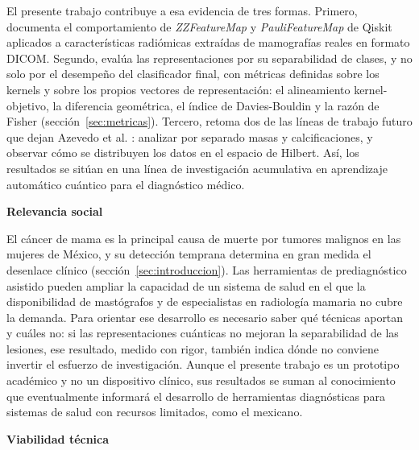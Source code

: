 El presente trabajo contribuye a esa evidencia de tres formas. Primero, documenta el comportamiento
de \textit{ZZFeatureMap} y \textit{PauliFeatureMap} de Qiskit aplicados a características radiómicas
extraídas de mamografías reales en formato DICOM. Segundo, evalúa las representaciones por su
separabilidad de clases, y no solo por el desempeño del clasificador final, con métricas definidas
sobre los kernels y sobre los propios vectores de representación: el alineamiento kernel-objetivo, la
diferencia geométrica, el índice de Davies-Bouldin y la razón de Fisher (sección~\ref{sec:metricas}).
Tercero, retoma dos de las líneas de trabajo futuro que dejan Azevedo et al.
\cite{Azevedo2022QuantumTransfer}: analizar por separado masas y calcificaciones, y observar cómo se
distribuyen los datos en el espacio de Hilbert. Así, los resultados se sitúan en una línea de
investigación acumulativa en aprendizaje automático cuántico para el diagnóstico médico.

\textbf{Relevancia social}

El cáncer de mama es la principal causa de muerte por tumores malignos en las mujeres de México, y su
detección temprana determina en gran medida el desenlace clínico (sección~\ref{sec:introduccion}).
Las herramientas de prediagnóstico asistido pueden ampliar la capacidad de un sistema de salud en el
que la disponibilidad de mastógrafos y de especialistas en radiología mamaria no cubre la demanda. Para
orientar ese desarrollo es necesario saber qué técnicas aportan y cuáles no: si las representaciones
cuánticas no mejoran la separabilidad de las lesiones, ese resultado, medido con rigor, también indica
dónde no conviene invertir el esfuerzo de investigación. Aunque el presente trabajo es un prototipo
académico y no un dispositivo clínico, sus resultados se suman al conocimiento que eventualmente
informará el desarrollo de herramientas diagnósticas para sistemas de salud con recursos limitados,
como el mexicano.

\textbf{Viabilidad técnica}

